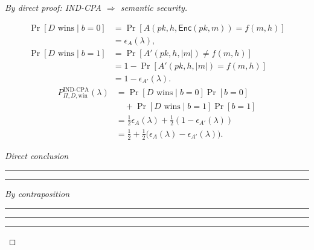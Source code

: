 \documentclass[12pt,a4paper]{article}
\begin{document}
\begin{proof}[By direct proof: IND-CPA $\Longrightarrow$ semantic security]
\begin{samepage}
\end{samepage}
\[
\begin{aligned}
\Pr[D\text{ wins}\mid b=0]
&=\Pr[A(pk,h,\mathsf{Enc}(pk,m))=f(m,h)]\\
&=\epsilon_A(\lambda),\\[4pt]
\Pr[D\text{ wins}\mid b=1]
&=\Pr[A'(pk,h,|m|)\ne f(m,h)]\\
&=1-\Pr[A'(pk,h,|m|)=f(m,h)]\\
&=1-\epsilon_{A'}(\lambda).
\end{aligned}
\]
\[
\begin{aligned}
P_{\Pi,D,\mathrm{win}}^{\mathrm{IND\text{-}CPA}}(\lambda)
&=\Pr[D\text{ wins}\mid b=0]\Pr[b=0]\\
&\quad+\Pr[D\text{ wins}\mid b=1]\Pr[b=1]\\
&=\frac12\epsilon_A(\lambda)+\frac12(1-\epsilon_{A'}(\lambda))\\
&=\frac12+\frac12\bigl(\epsilon_A(\lambda)-\epsilon_{A'}(\lambda)\bigr).
\end{aligned}
\]
\par\medskip\noindent
\begin{minipage}[t][5.6cm][t]{0.48\linewidth}
\vspace{0pt}
{\small\itshape Direct conclusion\par}
\smallskip\hrule\medskip
\centering
{}
\vfill\hrule
\end{minipage}
\hfill
\begin{minipage}[t][5.6cm][t]{0.48\linewidth}
\vspace{0pt}
{\raggedleft\small\itshape By contraposition\par}
\smallskip\hrule\medskip
\centering
{}
\smallskip
{}
\vfill\hrule
\end{minipage}
\par\medskip
\hrule\medskip
\end{proof}
\end{document}
